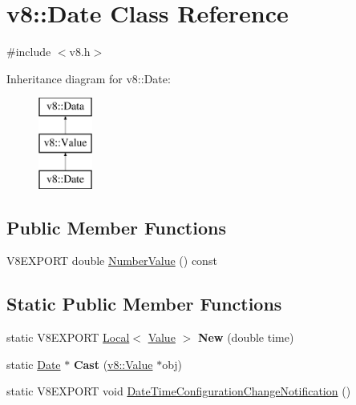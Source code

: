 \hypertarget{classv8_1_1_date}{}\section{v8\+:\+:Date Class Reference}
\label{classv8_1_1_date}


{\ttfamily \#include $<$v8.\+h$>$}

Inheritance diagram for v8\+:\+:Date\+:\begin{figure}[H]
\begin{center}
\leavevmode
\includegraphics[height=3.000000cm]{classv8_1_1_date}
\end{center}
\end{figure}
\subsection*{Public Member Functions}
\begin{DoxyCompactItemize}
\item 
V8\+E\+X\+P\+O\+R\+T double \hyperlink{classv8_1_1_date_ae9ccdc971d9738631ed2f28ef42d8a8c}{Number\+Value} () const 
\end{DoxyCompactItemize}
\subsection*{Static Public Member Functions}
\begin{DoxyCompactItemize}
\item 
\hypertarget{classv8_1_1_date_a00a33c616710d92dae77440182cc30b2}{}static V8\+E\+X\+P\+O\+R\+T \hyperlink{classv8_1_1_local}{Local}$<$ \hyperlink{classv8_1_1_value}{Value} $>$ {\bfseries New} (double time)\label{classv8_1_1_date_a00a33c616710d92dae77440182cc30b2}

\item 
\hypertarget{classv8_1_1_date_a8e5ea7c1f28924b82922270d6596b4d3}{}static \hyperlink{classv8_1_1_date}{Date} $\ast$ {\bfseries Cast} (\hyperlink{classv8_1_1_value}{v8\+::\+Value} $\ast$obj)\label{classv8_1_1_date_a8e5ea7c1f28924b82922270d6596b4d3}

\item 
static V8\+E\+X\+P\+O\+R\+T void \hyperlink{classv8_1_1_date_ab39a9ab67254d54956d4687f3dee6816}{Date\+Time\+Configuration\+Change\+Notification} ()
\end{DoxyCompactItemize}


